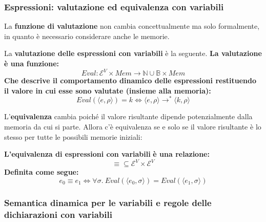 \documentclass[a4paper]{article}
\begin{document}
 	\subsubsection{Espressioni: valutazione ed equivalenza con variabili}
 	
 	La \textbf{funzione di valutazione} non cambia concettualmente ma solo formalmente, in quanto è necessario considerare anche le memorie.
 	
 	\begin{boxdef}
 		La \textcolor{Red3}{\textbf{valutazione delle espressioni con variabili}} è la seguente. \textbf{La valutazione è una funzione:}
 		\begin{equation*}
 			Eval: \mathcal{E}^{V} \times Mem \longrightarrow \mathbb{N} \cup \mathbb{B} \times Mem
 		\end{equation*}
 		\textbf{Che descrive il comportamento dinamico delle espressioni restituendo il valore in cui esse sono valutate (insieme alla memoria):}
 		\begin{equation*}
 			Eval\left(\langle e, \rho \rangle\right) = k \iff \langle e,\rho \rangle \longrightarrow^{*} \langle k,\rho \rangle
 		\end{equation*}
 	\end{boxdef}\:\newline
 
 	\noindent
 	L'\textbf{equivalenza} cambia poiché il valore risultante dipende potenzialmente dalla memoria da cui si parte. Allora c'è equivalenza se e solo se il valore risultante è lo stesso per tutte le possibili memorie iniziali:
 	
 	\begin{boxdef}
 		\textbf{L'}\textcolor{Red3}{\textbf{equivalenza di espressioni con variabili}} \textbf{è una relazione:}
 		\begin{equation*}
 			\equiv \subseteq \mathcal{E}^{V} \times \mathcal{E}^{V}
 		\end{equation*}
 		\textbf{Definita come segue:}
 		\begin{equation*}
 			e_{0} \equiv e_{1} \iff \forall \sigma. \: Eval\left(\langle e_{0},\sigma \rangle\right) = Eval\left( \langle e_{1},\sigma \rangle \right)
 		\end{equation*}
 	\end{boxdef}\newpage
 	
 	\subsubsection{Semantica dinamica per le variabili e regole delle dichiarazioni con variabili}
 	
\end{document}
